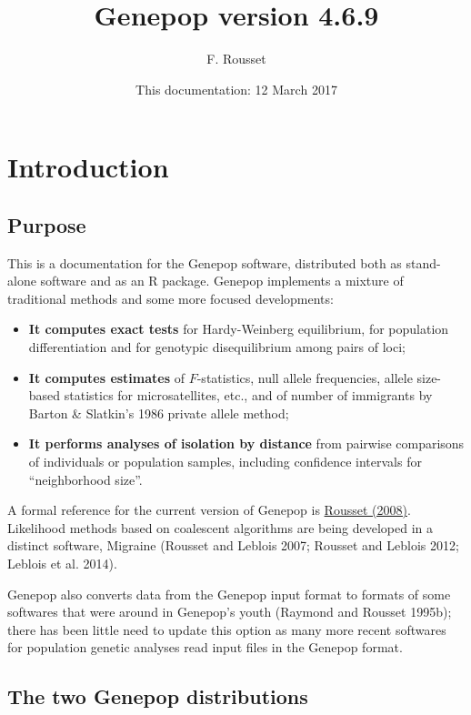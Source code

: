 \documentclass[12pt,]{book}
\title{Genepop version 4.6.9}
\author{F. Rousset}
\date{This documentation: 12 March 2017}
\begin{document}
\maketitle

{
\setcounter{tocdepth}{1}
\tableofcontents
}
\chapter{Introduction}\label{introduction}

\section{Purpose}\label{purpose}

This is a documentation for the Genepop software, distributed both as
stand-alone software and as an R package. Genepop implements a mixture
of traditional methods and some more focused developments:

\begin{itemize}
\item
  \textbf{It computes exact tests} for Hardy-Weinberg equilibrium, for
  population differentiation and for genotypic disequilibrium among
  pairs of loci;
\item
  \textbf{It computes estimates} of \(F\)-statistics, null allele
  frequencies, allele size-based statistics for microsatellites, etc.,
  and of number of immigrants by Barton \& Slatkin's 1986 private allele
  method;
\item
  \textbf{It performs analyses of isolation by distance} from pairwise
  comparisons of individuals or population samples, including confidence
  intervals for ``neighborhood size''.
\end{itemize}

A formal reference for the current version of Genepop is
\href{http://dx.doi.org/10.1111/j.1471-8286.2007.01931.x}{Rousset
(2008)}. Likelihood methods based on coalescent algorithms are being
developed in a distinct software, Migraine (Rousset and Leblois 2007;
Rousset and Leblois 2012; Leblois et al. 2014).

Genepop also converts data from the Genepop input format to formats of
some softwares that were around in Genepop's youth (Raymond and Rousset
1995b); there has been little need to update this option as many more
recent softwares for population genetic analyses read input files in the
Genepop format.

\section{The two Genepop
distributions}\label{the-two-genepop-distributions}
\end{document}
